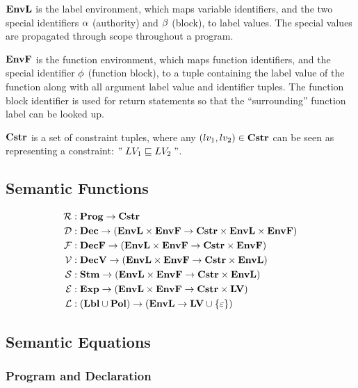 $\mathbf{EnvL}$ is the label environment, which maps variable identifiers, and the two special identifiers $\alpha$ (authority) and $\beta$ (block), to label values.
The special values are propagated through scope throughout a program.

$\mathbf{EnvF}$ is the function environment, which maps function identifiers, and the special identifier $\phi$ (function block), to a tuple containing the label value of the function along with all argument label value and identifier tuples.
The function block identifier is used for return statements so that the ``surrounding'' function label can be looked up.

$\mathbf{Cstr}$ is a set of constraint tuples, where any $(lv_1, lv_2) \in \mathbf{Cstr}$ can be seen as representing a constraint: $" \; LV_1 \sqsubseteq LV_2 \; "$.

\subsection{Semantic Functions}
\begin{align*}
\mathcal{R} & : \mathbf{Prog} \rightarrow \mathbf{Cstr} \\
\mathcal{D} & : \mathbf{Dec} \rightarrow (\mathbf{EnvL} \times \mathbf{EnvF} \rightarrow \mathbf{Cstr} \times \mathbf{EnvL} \times \mathbf{EnvF}) \\
\mathcal{F} & : \mathbf{DecF} \rightarrow (\mathbf{EnvL} \times \mathbf{EnvF} \rightarrow \mathbf{Cstr} \times \mathbf{EnvF}) \\
\mathcal{V} & : \mathbf{DecV} \rightarrow (\mathbf{EnvL} \times \mathbf{EnvF} \rightarrow \mathbf{Cstr} \times \mathbf{EnvL}) \\
\mathcal{S} & : \mathbf{Stm} \rightarrow (\mathbf{EnvL} \times \mathbf{EnvF} \rightarrow \mathbf{Cstr} \times \mathbf{EnvL}) \\
\mathcal{E} & : \mathbf{Exp} \rightarrow (\mathbf{EnvL} \times \mathbf{EnvF} \rightarrow \mathbf{Cstr} \times \mathbf{LV}) \\
\mathcal{L} & : (\mathbf{Lbl} \cup \mathbf{Pol}) \rightarrow (\mathbf{EnvL} \rightarrow \mathbf{LV} \cup \{ \varepsilon \})
\end{align*}

\subsection{Semantic Equations}

\subsubsection{Program and Declaration}

